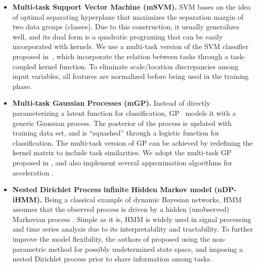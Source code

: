 \begin{itemize}
  \item
  \textbf{Multi-task Support Vector Machine (mSVM).}
  SVM \cite{bib:wang2005support} bases on the idea of optimal separating hyperplane that maximizes the separation margin of two data groups (classes).
  Due to this construction, it usually generalizes well, and its dual form is a quadratic programing that can be easily incorporated with kernels.
  We use a multi-task version of the SVM classifier proposed in~\cite{evgeniou2004regularized}, which incorporate the relation between tasks through a task-coupled kernel function.
  To eliminate scale/location discrepancies among input variables, all features are normalized before being used in the training phase.


  \item
  \textbf{Multi-task Gaussian Processes (mGP).}
  Instead of directly parameterizing a latent function for classification, GP~\cite{bib:rasmussen2006gaussian} models it with a generic Gaussian process.
  The posterior of the process is updated with training data set, and is ``squashed'' through a logistic function for classification.
  The multi-task version of GP can be achieved by redefining the kernel matrix to include task similarities. We adopt the multi-task GP proposed in \cite{bonilla2007multi}, and also implement several approximation algorithms for acceleration \cite{bib:chalupka2013framework}.


  \item
  \textbf{Nested Dirichlet Process infinite Hidden Markov model (nDP-iHMM).}
  Being a classical example of dynamic Bayesian networks, HMM assumes that the observed process is driven by a hidden (unobserved) Markovian process \cite{bib:rabiner1986introduction}. Simple as it is, HMM is widely used in signal processing and time series analysis due to its interpretability and tractability. To further improve the model flexibility, the authors of \cite{ni2007multi} proposed using the non-parametric method for possibly undetermined state space, and imposing a nested Dirichlet process prior to share information among tasks.






\end{itemize}

